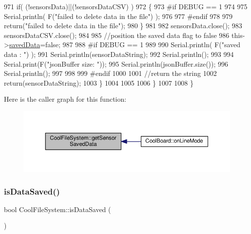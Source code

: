 \begin{DoxyCode}
971             \textcolor{keywordflow}{if}( (!sensorsData)||(!sensorsDataCSV) ) 
972             \{
973 \textcolor{preprocessor}{            #if DEBUG == 1}
974         
975                 Serial.println( F(\textcolor{stringliteral}{"failed to delete data in the file"}) );
976         
977 \textcolor{preprocessor}{            #endif}
978 
979                 \textcolor{keywordflow}{return}(\textcolor{stringliteral}{"failed to delete data in the file"});
980             \}
981 
982             sensorsData.close();
983             sensorsDataCSV.close();
984 
985             \textcolor{comment}{//position the saved data flag to false}
986             this->\hyperlink{classCoolFileSystem_ad398e0c5c41a0c88acdf5d672aa71351}{savedData}=\textcolor{keyword}{false}; 
987             
988 \textcolor{preprocessor}{        #if DEBUG == 1 }
989 
990             Serial.println( F(\textcolor{stringliteral}{"saved data : "}) );
991             Serial.println(sensorDataString);
992             Serial.println();
993 
994             Serial.print(F(\textcolor{stringliteral}{"jsonBuffer size: "}));
995             Serial.println(jsonBuffer.size());
996             Serial.println();
997 
998         
999 \textcolor{preprocessor}{        #endif}
1000 
1001             \textcolor{comment}{//return the string}
1002             \textcolor{keywordflow}{return}(sensorDataString);       
1003         \}
1004         
1005         
1006     \}
1007 
1008 \}
\end{DoxyCode}
Here is the caller graph for this function\+:
\nopagebreak
\begin{figure}[H]
\begin{center}
\leavevmode
\includegraphics[width=350pt]{classCoolFileSystem_a5c58bca3735c0ed3efb268d70ef998ef_icgraph}
\end{center}
\end{figure}
\mbox{\label{classCoolFileSystem_a5a7eaeea7a9fbf8aaef651d862fa3b5b}} 
\subsubsection{\texorpdfstring{is\+Data\+Saved()}{isDataSaved()}}
{\footnotesize\ttfamily bool Cool\+File\+System\+::is\+Data\+Saved (\begin{DoxyParamCaption}{ }\end{DoxyParamCaption})}

